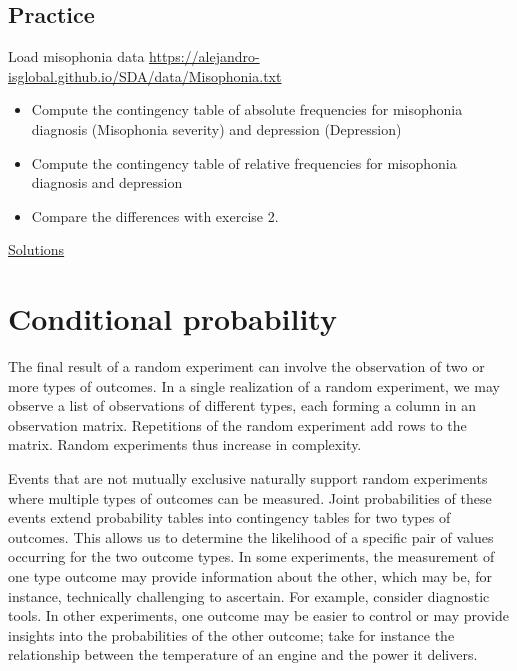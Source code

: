 \documentclass[
]{book}
\begin{document}
\hypertarget{practice-1}{%
\section{Practice}\label{practice-1}}

Load misophonia data \url{https://alejandro-isglobal.github.io/SDA/data/Misophonia.txt}

\begin{itemize}
\item
  Compute the contingency table of absolute frequencies for misophonia diagnosis (Misophonia severity) and depression (Depression)
\item
  Compute the contingency table of relative frequencies for misophonia diagnosis and depression
\item
  Compare the differences with exercise 2.
\end{itemize}

\href{https://colab.research.google.com/drive/1ncTaoBgskCJcBIb0-PdnbUFr_AKU0XRF?usp=sharing}{Solutions}

\hypertarget{conditional-probability}{%
\chapter{Conditional probability}\label{conditional-probability}}

The final result of a random experiment can involve the observation of two or more types of outcomes. In a single realization of a random experiment, we may observe a list of observations of different types, each forming a column in an observation matrix. Repetitions of the random experiment add rows to the matrix. Random experiments thus increase in complexity.

Events that are not mutually exclusive naturally support random experiments where multiple types of outcomes can be measured. Joint probabilities of these events extend probability tables into contingency tables for two types of outcomes. This allows us to determine the likelihood of a specific pair of values occurring for the two outcome types. In some experiments, the measurement of one type outcome may provide information about the other, which may be, for instance, technically challenging to ascertain. For example, consider diagnostic tools. In other experiments, one outcome may be easier to control or may provide insights into the probabilities of the other outcome; take for instance the relationship between the temperature of an engine and the power it delivers.
\end{document}
